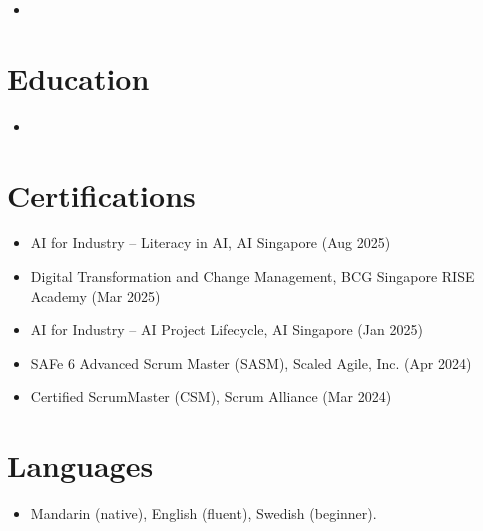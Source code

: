\documentclass[11pt,a4paper,sans]{moderncv}
\begin{document}
\begin{itemize}
\vspace{3pt}

\item{}

\end{itemize}


\section{Education}
\vspace{1pt}
\begin{itemize}

\item{}

\end{itemize}

\section{Certifications}
\vspace{1pt}
\begin{itemize}
\item AI for Industry -- Literacy in AI, AI Singapore (Aug 2025)
\item Digital Transformation and Change Management, BCG Singapore RISE Academy (Mar 2025)
\item AI for Industry -- AI Project Lifecycle, AI Singapore (Jan 2025)
\item SAFe 6 Advanced Scrum Master (SASM), Scaled Agile, Inc. (Apr 2024)
\item Certified ScrumMaster (CSM), Scrum Alliance (Mar 2024)
\end{itemize}


\section{Languages}
\vspace{1pt}
\begin{itemize}
\item Mandarin (native), English (fluent), Swedish (beginner).
\end{itemize}
\end{document}
